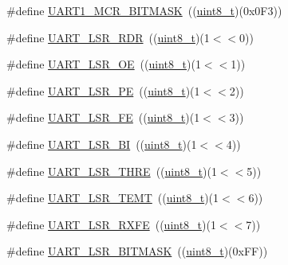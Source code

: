 \begin{DoxyCompactItemize}
\item 
\#define \hyperlink{group___u_a_r_t___private___macros_gafa1c3230af66a8c33f1febd18a1bf320}{U\+A\+R\+T1\+\_\+\+M\+C\+R\+\_\+\+B\+I\+T\+M\+A\+SK}~((\hyperlink{_p_e___types_8h_aba7bc1797add20fe3efdf37ced1182c5}{uint8\+\_\+t})(0x0\+F3))
\item 
\#define \hyperlink{group___u_a_r_t___private___macros_ga3d83de31d722cd373ee69a2a38aaed43}{U\+A\+R\+T\+\_\+\+L\+S\+R\+\_\+\+R\+DR}~((\hyperlink{_p_e___types_8h_aba7bc1797add20fe3efdf37ced1182c5}{uint8\+\_\+t})(1$<$$<$0))
\item 
\#define \hyperlink{group___u_a_r_t___private___macros_ga85c4312a700f6033bf0a075ae41de57c}{U\+A\+R\+T\+\_\+\+L\+S\+R\+\_\+\+OE}~((\hyperlink{_p_e___types_8h_aba7bc1797add20fe3efdf37ced1182c5}{uint8\+\_\+t})(1$<$$<$1))
\item 
\#define \hyperlink{group___u_a_r_t___private___macros_ga3ae0ee26be22b855aa08d68a2801d3d2}{U\+A\+R\+T\+\_\+\+L\+S\+R\+\_\+\+PE}~((\hyperlink{_p_e___types_8h_aba7bc1797add20fe3efdf37ced1182c5}{uint8\+\_\+t})(1$<$$<$2))
\item 
\#define \hyperlink{group___u_a_r_t___private___macros_ga18b1661d7c37ab40c9310311dd4f647d}{U\+A\+R\+T\+\_\+\+L\+S\+R\+\_\+\+FE}~((\hyperlink{_p_e___types_8h_aba7bc1797add20fe3efdf37ced1182c5}{uint8\+\_\+t})(1$<$$<$3))
\item 
\#define \hyperlink{group___u_a_r_t___private___macros_gaaca4bb43e62c7085534b67576e1ddbeb}{U\+A\+R\+T\+\_\+\+L\+S\+R\+\_\+\+BI}~((\hyperlink{_p_e___types_8h_aba7bc1797add20fe3efdf37ced1182c5}{uint8\+\_\+t})(1$<$$<$4))
\item 
\#define \hyperlink{group___u_a_r_t___private___macros_gae05118527ef8873b9d7b1b0be0153019}{U\+A\+R\+T\+\_\+\+L\+S\+R\+\_\+\+T\+H\+RE}~((\hyperlink{_p_e___types_8h_aba7bc1797add20fe3efdf37ced1182c5}{uint8\+\_\+t})(1$<$$<$5))
\item 
\#define \hyperlink{group___u_a_r_t___private___macros_gadb3f8bb82f0a253700fdb88d8c609710}{U\+A\+R\+T\+\_\+\+L\+S\+R\+\_\+\+T\+E\+MT}~((\hyperlink{_p_e___types_8h_aba7bc1797add20fe3efdf37ced1182c5}{uint8\+\_\+t})(1$<$$<$6))
\item 
\#define \hyperlink{group___u_a_r_t___private___macros_ga5972ac77db6249142b482356427dcf7c}{U\+A\+R\+T\+\_\+\+L\+S\+R\+\_\+\+R\+X\+FE}~((\hyperlink{_p_e___types_8h_aba7bc1797add20fe3efdf37ced1182c5}{uint8\+\_\+t})(1$<$$<$7))
\item 
\#define \hyperlink{group___u_a_r_t___private___macros_ga3643d58e12f1d3bf342d140a5e3cb1ae}{U\+A\+R\+T\+\_\+\+L\+S\+R\+\_\+\+B\+I\+T\+M\+A\+SK}~((\hyperlink{_p_e___types_8h_aba7bc1797add20fe3efdf37ced1182c5}{uint8\+\_\+t})(0x\+F\+F))

\end{DoxyCompactItemize}
